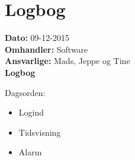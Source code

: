 \section{Logbog}

\textbf{Dato:} 09-12-2015 \\
\textbf{Omhandler:} Software \\
\textbf{Ansvarlige:} Mads, Jeppe og Tine \\
\textbf{Logbog}

Dagsorden:
\begin{itemize}
	\item Logind
	\item Tidsvisning
	\item Alarm
\end{itemize}

